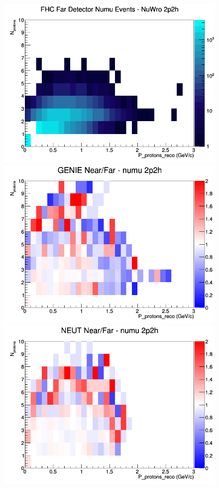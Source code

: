 \begin{figure}[h]
\endminipage
{}
\includegraphics[width=\linewidth]{eff_N_P/LAr/protons/2p2h_FHC_FD_numu_N_P_NuWro.png}
\endminipage
\newline
{}
\includegraphics[width=\linewidth]{eff_N_P/LAr/protons/ratios/2p2h_GENIE_numu_NF_N_P.png}
\endminipage
{}
\includegraphics[width=\linewidth]{eff_N_P/LAr/protons/ratios/2p2h_NEUT_numu_NF_N_P.png}

\end{figure}
